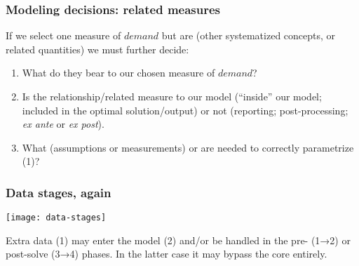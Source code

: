 \documentclass[12pt,aspectratio=169]{beamer}
\begin{document}
\begin{frame}
\frametitle{Modeling decisions: related measures}

If we select one measure of $demand$ but are  (other systematized concepts, or related quantities) we must further decide:

\bigskip\pause
\begin{enumerate}[<+->]
  \item What  do they bear to our chosen measure of $demand$?
  \item Is the relationship/related measure  to our model (“inside” our model; included in the optimal solution/output) or not (reporting; post-processing; \emph{ex ante} or \emph{ex post}).
  \item What  (assumptions or measurements) or  are needed to correctly parametrize (1)?
\end{enumerate}
\end{frame}

\begin{frame}
\frametitle{Data stages, again}
\texttt{[image: data-stages]}

Extra data (1) may enter the model (2) and/or be handled in the pre- (1→2) or post-solve (3→4) phases. In the latter case it may bypass the core entirely.
\end{frame}
\end{document}
